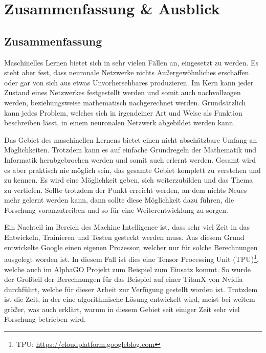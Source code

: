 \chapter{Zusammenfassung \& Ausblick}
\label{cha:ZusammenfassungAusblick}

\section{Zusammenfassung}

\noindent
Maschinelles Lernen bietet sich in sehr vielen Fällen an, eingesetzt zu werden. 
Es steht aber fest, dass neuronale Netzwerke nichts Außergewöhnliches erschaffen oder gar von sich aus etwas Unvorhersehbares produzieren. 
Im Kern kann jeder Zustand eines Netzwerkes festgestellt werden und somit auch nachvollzogen werden, beziehungsweise mathematisch nachgerechnet werden. 
Grundsätzlich kann jedes Problem, welches sich in irgendeiner Art und Weise als Funktion beschreiben lässt, in einem neuronalen Netzwerk abgebildet werden kann. \newline

\noindent
Das Gebiet des maschinellen Lernens bietet einen nicht abschätzbare Umfang an Möglichkeiten. 
Trotzdem kann es auf einfache Grundregeln der Mathematik und Informatik herabgebrochen werden und somit auch erlernt werden. 
Gesamt wird es aber praktisch nie möglich sein, das gesamte Gebiet komplett zu verstehen und zu kennen.
Es wird eine Möglichkeit geben, sich weiterzubilden und das Thema zu vertiefen. 
Sollte trotzdem der Punkt erreicht werden, an dem nichts Neues mehr gelernt werden kann, dann sollte diese Möglichkeit dazu führen, die Forschung voranzutreiben und so für eine Weiterentwicklung zu sorgen. \newline

\noindent
Ein Nachteil im Bereich des Machine Intelligence ist, dass sehr viel Zeit in das Entwickeln, Trainieren und Testen gesteckt werden muss. 
Aus diesem Grund entwickelte Google einen eigenen Prozessor, welcher nur für solche Berechnungen ausgelegt worden ist. 
In diesem Fall ist dies eine Tensor Processing Unit (TPU)\footnote{TPU: \url{https://cloudplatform.googleblog.com}}, welche auch im AlphaGO Projekt zum Beispiel zum Einsatz kommt. 
So wurde der Großteil der Berechnungen für das Beispiel auf einer TitanX von Nvidia durchführt, welche für dieser Arbeit zur Verfügung gestellt worden ist. 
Trotzdem ist die Zeit, in der eine algorithmische Lösung entwickelt wird, meist bei weitem größer, was auch erklärt, warum in diesem Gebiet seit einiger Zeit sehr viel Forschung betrieben wird. 

